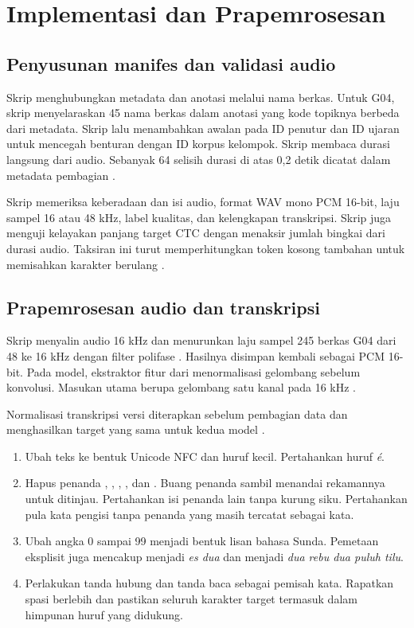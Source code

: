 \chapter{Implementasi dan Prapemrosesan}
\label{bab:implementasi}

\section{Penyusunan manifes dan validasi audio}

Skrip  menghubungkan metadata dan anotasi melalui nama berkas. Untuk G04, skrip menyelaraskan 45 nama berkas dalam anotasi yang kode topiknya berbeda dari metadata. Skrip lalu menambahkan awalan  pada ID penutur dan ID ujaran untuk mencegah benturan dengan ID korpus kelompok. Skrip membaca durasi langsung dari audio. Sebanyak 64 selisih durasi di atas 0,2 detik dicatat dalam metadata pembagian \cite{repoasr}.

Skrip memeriksa keberadaan dan isi audio, format WAV mono PCM 16-bit, laju sampel 16 atau 48 kHz, label kualitas, dan kelengkapan transkripsi. Skrip juga menguji kelayakan panjang target CTC dengan menaksir jumlah bingkai dari durasi audio. Taksiran ini turut memperhitungkan token kosong tambahan untuk memisahkan karakter berulang \cite{graves2006,repoasr}.

\section{Prapemrosesan audio dan transkripsi}

Skrip  menyalin audio 16 kHz dan menurunkan laju sampel 245 berkas G04 dari 48 ke 16 kHz dengan filter polifase . Hasilnya disimpan kembali sebagai PCM 16-bit. Pada model, ekstraktor fitur dari  menormalisasi gelombang sebelum konvolusi. Masukan utama berupa gelombang satu kanal pada 16 kHz \cite{scipy,soundfile,transformers,repoasr}.

Normalisasi transkripsi versi  diterapkan sebelum pembagian data dan menghasilkan target yang sama untuk kedua model \cite{repoasr}.

\begin{enumerate}
  \item Ubah teks ke bentuk Unicode NFC dan huruf kecil. Pertahankan huruf \textit{é}.
  \item Hapus penanda \kode{[ee]}, \kode{[ee..]}, \kode{[noise]}, \kode{[overlap]}, dan \kode{[s]}. Buang penanda \kode{[unclear]} sambil menandai rekamannya untuk ditinjau. Pertahankan isi penanda lain tanpa kurung siku. Pertahankan pula kata pengisi tanpa penanda yang masih tercatat sebagai kata.
  \item Ubah angka 0 sampai 99 menjadi bentuk lisan bahasa Sunda. Pemetaan eksplisit juga mencakup  menjadi \textit{es dua} dan  menjadi \textit{dua rebu dua puluh tilu}.
  \item Perlakukan tanda hubung dan tanda baca sebagai pemisah kata. Rapatkan spasi berlebih dan pastikan seluruh karakter target termasuk dalam himpunan huruf yang didukung.
\end{enumerate}

